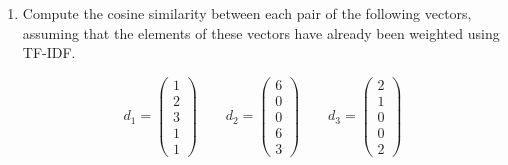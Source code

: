 \documentclass[12pt]{article}
\newcommand{\answer}[1]{\fbox{\parbox{\linewidth}{#1}}}
\begin{document}
\begin{enumerate}[itemsep=3em]
		\item{
			Compute the cosine similarity between each pair of the following vectors, assuming that the elements of these vectors have already been weighted using TF-IDF.
		
			\[ d_{1} = \left(\begin{array}{c}
				1 \\ 2 \\ 3 \\ 1 \\ 1
			 \end{array} \right) 	
			 \qquad		 
			 d_{2} = \left(\begin{array}{c}
				6 \\ 0 \\ 0 \\ 6 \\ 3
			 \end{array} \right)	
			 \qquad		 
			 d_{3} = \left(\begin{array}{c}
				2 \\ 1 \\ 0 \\ 0 \\ 2
			 \end{array} \right)\] 
			 
			\answer{}
		}
	\end{enumerate}	
\end{document}

